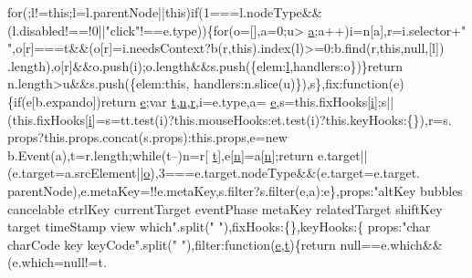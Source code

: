 \begin{DoxyCode}
{{{      for}(;l!=\textcolor{keyword}{this};l=l.parentNode||\textcolor{keyword}{this})\textcolor{keywordflow}{if}(1===l.nodeType&&(l.disabled!==!0||\textcolor{stringliteral}{"click"}!==e.type))\{\textcolor{keywordflow}{for}(o=[],a=0;u>
      \hyperlink{root_2static_2root_2js_2bootstrap_2bootstrap_8min_8js_ae8f6b400ed3390908c5cdeebed3a82b9}{a};a++)i=n[a],r=i.selector+\textcolor{stringliteral}{" "},o[r]===t&&(o[r]=i.needsContext?b(r,\textcolor{keyword}{this}).index(l)>=0:b.find(r,\textcolor{keyword}{this},null,[l])
      .length),o[r]&&o.push(i);o.length&&s.push(\{elem:\hyperlink{jquery-migrate-1_82_81_8min_8js_ae5e71a2600e8891c54854be157cc6626}{l},handlers:o\})\}\textcolor{keywordflow}{return} n.length>u&&s.push(\{elem:\textcolor{keyword}{this},
      handlers:n.slice(u)\}),s\},fix:\textcolor{keyword}{function}(e)\{\textcolor{keywordflow}{if}(e[b.expando])\textcolor{keywordflow}{return} \hyperlink{jquery-1_89_81_8min_8js_a2c038346d47955cbe2cb91e338edd7e1}{e};var \hyperlink{jquery-1_89_81_8min_8js_a23c5666e83bbbceee94adcd0851f50c4}{t},\hyperlink{root_2static_2root_2js_2bootstrap_2jquery-ui-1_810_84_8custom_8min_8js_afc984c4f6c68ce30a0af99006f5f8d27}{n},\hyperlink{prism_8js_a514f1b439f404f86f77090fa9edc96ce}{r},i=e.type,a=
      \hyperlink{jquery-1_89_81_8min_8js_a2c038346d47955cbe2cb91e338edd7e1}{e},s=this.fixHooks[\hyperlink{jquery-1_89_81_8min_8js_a7e98b8a17c0aad30ba64d47b74e2a6c1}{i}];s||(this.fixHooks[\hyperlink{jquery-1_89_81_8min_8js_a7e98b8a17c0aad30ba64d47b74e2a6c1}{i}]=s=tt.test(i)?this.mouseHooks:et.test(i)?this.keyHooks:\{\}),r=s.
      props?\textcolor{keyword}{this}.props.concat(s.props):this.props,e=\textcolor{keyword}{new} b.Event(a),t=r.length;\textcolor{keywordflow}{while}(t--)n=r[
      \hyperlink{jquery-1_89_81_8min_8js_a23c5666e83bbbceee94adcd0851f50c4}{t}],e[\hyperlink{root_2static_2root_2js_2bootstrap_2jquery-ui-1_810_84_8custom_8min_8js_afc984c4f6c68ce30a0af99006f5f8d27}{n}]=a[\hyperlink{root_2static_2root_2js_2bootstrap_2jquery-ui-1_810_84_8custom_8min_8js_afc984c4f6c68ce30a0af99006f5f8d27}{n}];\textcolor{keywordflow}{return} e.target||(e.target=a.srcElement||\hyperlink{jquery-1_89_81_8min_8js_ae47ca7a09cf6781e29634502345930a7}{o}),3===e.target.nodeType&&(e.target=e.target.
      parentNode),e.metaKey=!!e.metaKey,s.filter?s.filter(e,a):e\},props:\textcolor{stringliteral}{"altKey bubbles cancelable ctrlKey
       currentTarget eventPhase metaKey relatedTarget shiftKey target timeStamp view which"}.split(\textcolor{stringliteral}{" "}),fixHooks:\{\},keyHooks:\{
      props:\textcolor{stringliteral}{"char charCode key keyCode"}.split(\textcolor{stringliteral}{" "}),filter:\textcolor{keyword}{function}(\hyperlink{jquery-1_89_81_8min_8js_a2c038346d47955cbe2cb91e338edd7e1}{e},\hyperlink{jquery-1_89_81_8min_8js_a23c5666e83bbbceee94adcd0851f50c4}{t})\{\textcolor{keywordflow}{return} null==e.which&&(e.which=null!=t.
}}
\end{DoxyCode}
